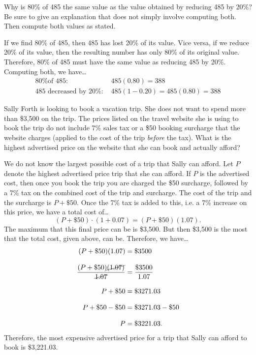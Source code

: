 \documentclass[11pt,letterpaper]{article}
\begin{document}
\newpage



 Why is 80\% of 485 the same value as the value obtained by reducing 485 by 20\%? Be sure to give an explanation that does not simply involve computing both. Then compute both values as stated. \pspace

\sol If we find 80\% of 485, then 485 has lost 20\% of its value. Vice versa, if we reduce 20\% of its value, then the resulting number has only 80\% of its original value. Therefore, 80\% of 485 must have the same value as reducing 485 by 20\%. Computing both, we have\dots \pspace
	\[
	\begin{aligned}
	\text{80\% of 485: }& 485(0.80)= 388 \\[0.3cm]
	\text{485 decreased by 20\%: }& 485(1 - 0.20)= 485(0.80)= 388
	\end{aligned}
	\]



\newpage



 Sally Forth is looking to book a vacation trip. She does not want to spend more than \$3,500 on the trip. The prices listed on the travel website she is using to book the trip do not include 7\% sales tax or a \$50 booking surcharge that the website charges (applied to the cost of the trip \textit{before} the tax). What is the highest advertised price on the website that she can book and actually afford? \pspace

\sol We do not know the largest possible cost of a trip that Sally can afford. Let $P$ denote the highest advertised price trip that she can afford. If $P$ is the advertised cost, then once you book the trip you are charged the \$50 surcharge, followed by a 7\% tax on the combined cost of the trip and surcharge. The cost of the trip and the surcharge is $P + \$50$. Once the 7\% tax is added to this, i.e. a 7\% increase on this price, we have a total cost of\dots \pspace
	\[
	(P + \$50) \cdot (1 + 0.07)= (P + \$50)(1.07).
	\] \pspace
The maximum that this final price can be is \$3,500. But then \$3,500 is the most that the total cost, given above, can be. Therefore, we have\dots \pspace
	\[
	\begin{aligned}
	(P + \$50)(1.07)&= \$3500 \\[0.3cm]
	\dfrac{(P + \$50)\cancel{(1.07)}}{\cancel{1.07}}&= \dfrac{\$3500}{1.07} \\[0.3cm]
	P + \$50&= \$3271.03 \\[0.3cm]
	P + \$50 - \$50&= \$3271.03 - \$50 \\[0.3cm]
	P&= \$3221.03.
	\end{aligned}
	\] \pspace
Therefore, the most expensive advertised price for a trip that Sally can afford to book is \$3,221.03. 
\end{document}
